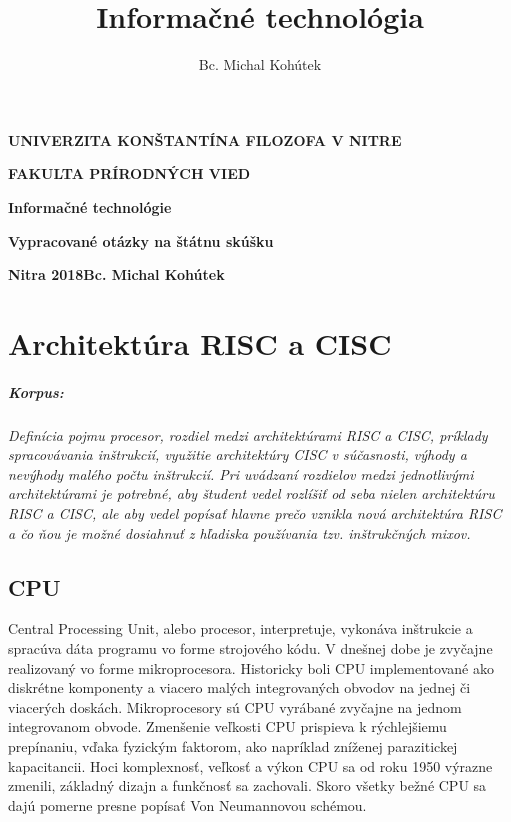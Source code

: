 \documentclass[11pt,a4paper]{report}
\author{Bc. Michal Kohútek}
\title{Informačné technológia}
\begin{document}
\begin{titlepage}
	
{\centering
{\bfseries\LARGE UNIVERZITA KONŠTANTÍNA FILOZOFA V NITRE \par}
{\bfseries\LARGE FAKULTA PRÍRODNÝCH VIED \par}
\vfill
{\bfseries\LARGE Informačné technológie\par}
\vspace{1cm}
{\bfseries\Large Vypracované otázky na štátnu skúšku\par}
\par}
\vfill


\Large{\noindent\textbf{Nitra 2018}\hfill\textbf{Bc. Michal Kohútek}}
\end{titlepage}

\tableofcontents

\chapter{Architektúra RISC a CISC}
\setcounter{page}{2}
\pagestyle{scrplain}

\paragraph{Korpus:} \textit{Definícia pojmu procesor, rozdiel medzi architektúrami RISC a CISC, príklady spracovávania inštrukcií, využitie architektúry CISC v súčasnosti, výhody a nevýhody malého počtu inštrukcií. Pri uvádzaní rozdielov medzi jednotlivými architektúrami je potrebné, aby študent vedel rozlíšiť od seba nielen architektúru RISC a CISC, ale aby vedel popísať hlavne prečo vznikla nová architektúra RISC a čo ňou je možné dosiahnuť z hľadiska používania tzv. inštrukčných mixov.}

\section{CPU} Central Processing Unit, alebo procesor, interpretuje, vykonáva inštrukcie a spracúva dáta programu vo forme strojového kódu. V dnešnej dobe je zvyčajne realizovaný vo forme mikroprocesora. Historicky boli CPU implementované ako diskrétne komponenty a viacero malých integrovaných obvodov na jednej či viacerých doskách. Mikroprocesory sú CPU vyrábané zvyčajne na jednom integrovanom obvode. Zmenšenie veľkosti CPU prispieva k rýchlejšiemu prepínaniu, vďaka fyzickým faktorom, ako napríklad zníženej parazitickej kapacitancii. Hoci komplexnosť, veľkosť a výkon CPU sa od roku 1950 výrazne zmenili, základný dizajn a funkčnosť sa zachovali. Skoro všetky bežné CPU sa dajú pomerne presne popísať Von Neumannovou schémou.
\end{document}
